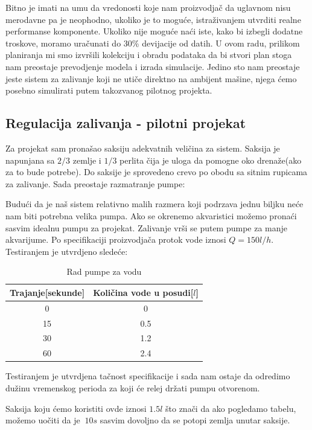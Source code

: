 \documentclass[a4paper,11pt]{book}
\begin{document}
\noindent Bitno je imati na umu da vredonosti koje nam proizvodjač da uglavnom nisu merodavne pa je neophodno, ukoliko je to moguće, istraživanjem utvrditi realne performanse komponente. Ukoliko nije moguće naći iste, kako bi izbegli dodatne troskove, moramo uračunati do 30\% devijacije od datih. U ovom radu, prilikom planiranja mi smo izvršili kolekciju i obradu podataka da bi stvori plan stoga nam preostaje prevodjenje modela i izrada simulacije. Jedino sto nam preostaje jeste sistem za zalivanje koji ne utiče direktno na ambijent mašine, njega ćemo posebno simulirati putem takozvanog pilotnog projekta. 

\subsection{Regulacija zalivanja - pilotni projekat}

Za projekat sam pronašao saksiju adekvatnih veličina za sistem. Saksija je napunjana sa $2/3$ zemlje i $1/3$ perlita čija je uloga da pomogne oko drenaže(ako za to bude potrebe). Do saksije je sprovedeno crevo po obodu sa sitnim rupicama za zalivanje. Sada preostaje razmatranje pumpe:

Budući da je naš sistem relativno malih razmera koji podrzava jednu biljku neće nam biti potrebna velika pumpa. Ako se okrenemo akvaristici možemo pronaći sasvim idealnu pumpu za projekat. 
Zalivanje vrši se putem pumpe za manje akvarijume. Po specifikaciji proizvodjača protok vode iznosi $Q = 150 l/h$. Testiranjem je utvrdjeno sledeće:

\begin{table}[ht]
  \caption{Rad pumpe za vodu}
  \centering
  \begin{tabular}{|c|c|}
  \hline
    Trajanje[sekunde] & Količina vode u posudi[$l$]\\ \hline
  0 & 0 \\ \hline
  15 & 0.5 \\ \hline
  30 & 1.2 \\ \hline
  60 & 2.4 \\ \hline
  \end{tabular}
\end{table}

Testiranjem je utvrdjena tačnost specifikacije i sada nam ostaje da odredimo dužinu vremenskog perioda za koji će relej držati pumpu otvorenom.

Saksija koju ćemo koristiti ovde iznosi $1.5l$ što znači da ako pogledamo tabelu, možemo uočiti da je $~10s$ sasvim dovoljno da se potopi zemlja unutar saksije.
\end{document}
